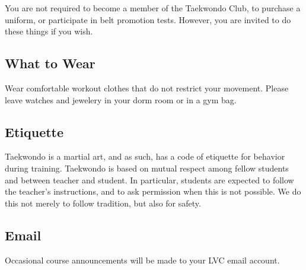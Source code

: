\documentclass[11pt]{article}
\begin{document}
You are not required to become a member of the Taekwondo Club, to
purchase a uniform, or participate in belt promotion tests. However, you
are invited to do these things if you wish. 

\vspace*{-3ex}
\subsection*{What to Wear}
\vspace*{-1ex}

Wear comfortable workout clothes that do not restrict your
movement. Please leave watches and jewelery in your dorm room or in a
gym bag.


\vspace*{-3ex}
\subsection*{Etiquette}
\vspace*{-1ex}

 Taekwondo is a martial art, and as such, has a code of etiquette for
 behavior during training. Taekwondo is based on mutual respect among
 fellow students and between teacher and student. In particular,
 students are expected to follow the teacher's instructions, and to ask
 permission when this is not possible. We do this not merely to follow
 tradition, but also for safety.

\vspace*{-3ex}
\subsection*{Email}
\vspace*{-1ex}

Occasional course announcements will be made to your LVC email account.
\end{document}
